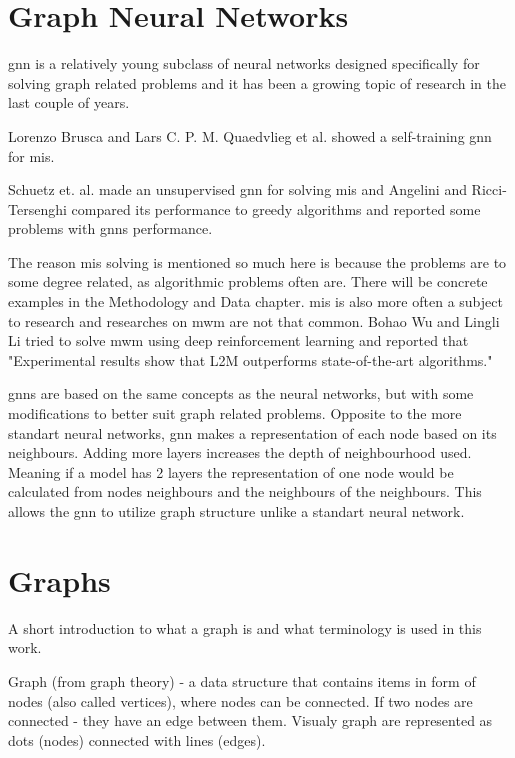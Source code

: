 \section{Graph Neural Networks}

\gls{gnn} is a relatively young subclass of neural networks designed specifically for solving graph related problems and it has been a growing topic of research in the last couple of years.

Lorenzo Brusca and Lars C. P. M. Quaedvlieg et al. \cite{brusca2023maximum} showed a self-training \gls{gnn} for \gls{mis}. 

Schuetz et. al. made an unsupervised \gls{gnn} \cite{Schuetz2022} for solving \gls{mis} and Angelini and Ricci-Tersenghi \cite{Angelini2022} compared  its performance to greedy algorithms and reported some problems with \gls{gnn}s performance.

The reason \gls{mis} solving is mentioned so much here is because the problems are to some degree related, as algorithmic problems often are. There will be concrete examples in the Methodology and Data chapter. \gls{mis} is also more often a subject to research and researches on \gls{mwm} are not that common. Bohao Wu and Lingli Li tried to solve \gls{mwm} using deep reinforcement learning \cite{WU2022400} and reported that "Experimental results show that L2M outperforms state-of-the-art algorithms."

\gls{gnn}s are based on the same concepts as the neural networks, but with some modifications to better suit graph related problems. Opposite to the more standart neural networks, \gls{gnn} makes a representation of each node based on its neighbours. Adding more layers increases the depth of neighbourhood used. Meaning if a model has 2 layers the representation of one node would be calculated from nodes neighbours and the neighbours of the neighbours. This allows the \gls{gnn} to utilize graph structure unlike a standart neural network.

\section{Graphs}

A short introduction to what a graph is and what terminology is used in this work.

Graph (from graph theory) - a data structure that contains items in form of nodes (also called vertices), where nodes can be connected. If two nodes are connected - they have an edge between them. Visualy graph are represented as dots (nodes) connected with lines (edges).

